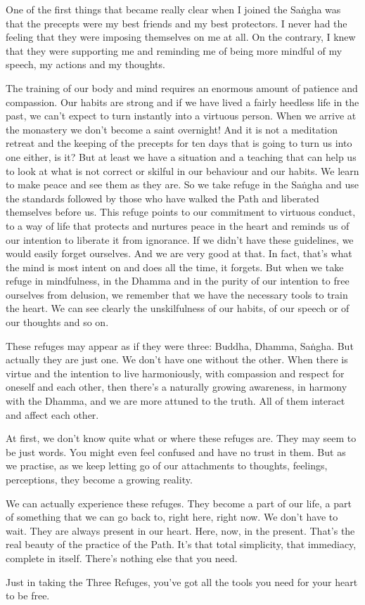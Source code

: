 One of the first things that became really clear when I joined the Sa\.ngha was that the precepts were my best friends and my best protectors. I never had the feeling that they were imposing themselves on me at all. On the contrary, I knew that they were supporting me and reminding me of being more mindful of my speech, my actions and my thoughts.

The training of our body and mind requires an enormous amount of patience and compassion. Our habits are strong and if we have lived a fairly heedless life in the past, we can't expect to turn instantly into a virtuous person. When we arrive at the monastery we don't become a saint overnight! And it is not a meditation retreat and the keeping of the precepts for ten days that is going to turn us into one either, is it? But at least we have a situation and a teaching that can help us to look at what is not correct or skilful in our behaviour and our habits. We learn to make peace and see them as they are. So we take refuge in the Sa\.ngha and use the standards followed by those who have walked the Path and liberated themselves before us. This refuge points to our commitment to virtuous conduct, to a way of life that protects and nurtures peace in the heart and reminds us of our intention to liberate it from ignorance. If we didn't have these guidelines, we would easily forget ourselves. And we are very good at that. In fact, that's what the mind is most intent on and does all the time, it forgets. But when we take refuge in mindfulness, in the Dhamma and in the purity of our intention to free ourselves from delusion, we remember that we have the necessary tools to train the heart. We can see clearly the unskilfulness of our habits, of our speech or of our thoughts and so on.

These refuges may appear as if they were three: Buddha, Dhamma, Sa\.ngha. But actually they are just one. We don't have one without the other. When there is virtue and the intention to live harmoniously, with compassion and respect for oneself and each other, then there's a naturally growing awareness, in harmony with the Dhamma, and we are more attuned to the truth. All of them interact and affect each other.

At first, we don't know quite what or where these refuges are. They may seem to be just words. You might even feel confused and have no trust in them. But as we practise, as we keep letting go of our attachments to thoughts, feelings, perceptions, they become a growing reality.

We can actually experience these refuges. They become a part of our life, a part of something that we can go back to, right here, right now. We don't have to wait. They are always present in our heart. Here, now, in the present. That's the real beauty of the practice of the Path. It's that total simplicity, that immediacy, complete in itself. There's nothing else that you need. 

Just in taking the Three Refuges, you've got all the tools you need for your heart to be free.
